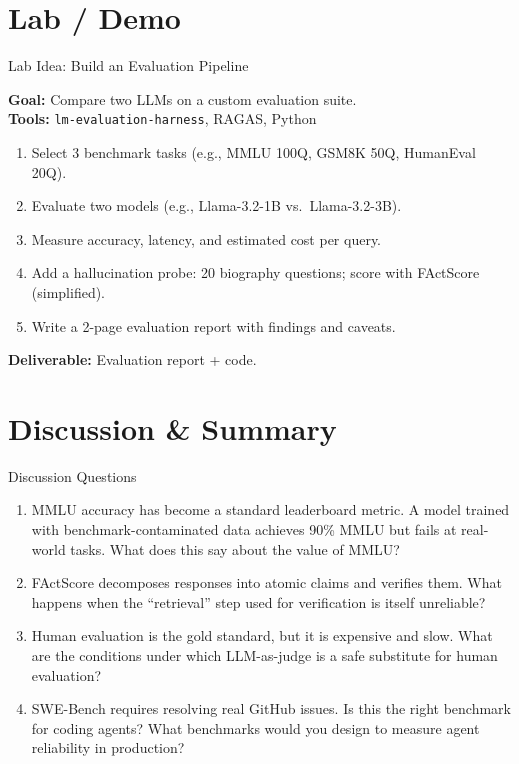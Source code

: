 \documentclass[aspectratio=169,10pt]{beamer}
\begin{document}
\section{Lab / Demo}
\begin{frame}{Lab Idea: Build an Evaluation Pipeline}
  \begin{tcolorbox}[hitbox, title=Lab 11 — LLM Evaluation Suite]
    \textbf{Goal:} Compare two LLMs on a custom evaluation suite.\\[4pt]
    \textbf{Tools:} \texttt{lm-evaluation-harness}, RAGAS, Python
    \begin{enumerate}
      \item Select 3 benchmark tasks (e.g., MMLU 100Q, GSM8K 50Q, HumanEval 20Q).
      \item Evaluate two models (e.g., Llama-3.2-1B vs.\ Llama-3.2-3B).
      \item Measure accuracy, latency, and estimated cost per query.
      \item Add a hallucination probe: 20 biography questions; score with FActScore (simplified).
      \item Write a 2-page evaluation report with findings and caveats.
    \end{enumerate}
    \textbf{Deliverable:} Evaluation report + code.
  \end{tcolorbox}
\end{frame}

\section{Discussion \& Summary}
\begin{frame}{Discussion Questions}
  \begin{enumerate}
    \item MMLU accuracy has become a standard leaderboard metric. A model trained with benchmark-contaminated data achieves 90\% MMLU but fails at real-world tasks. What does this say about the value of MMLU?
    \item FActScore decomposes responses into atomic claims and verifies them. What happens when the ``retrieval'' step used for verification is itself unreliable?
    \item Human evaluation is the gold standard, but it is expensive and slow. What are the conditions under which LLM-as-judge is a safe substitute for human evaluation?
    \item SWE-Bench requires resolving real GitHub issues. Is this the right benchmark for coding agents? What benchmarks would you design to measure agent reliability in production?
  \end{enumerate}
\end{frame}
\end{document}
